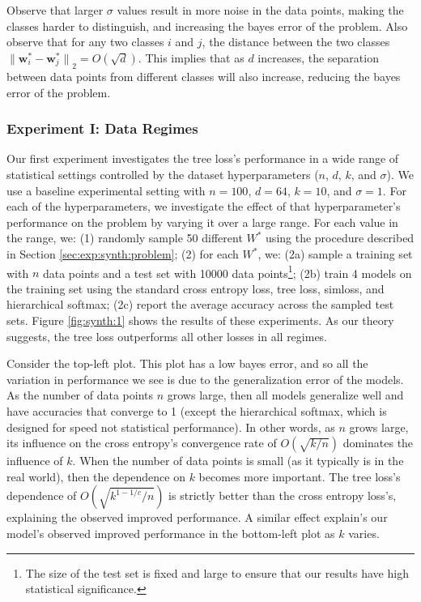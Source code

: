 \documentclass[twoside]{article}
\DeclareMathOperator*{\argmin}{arg\,min}
\renewcommand{\star}[1]{{#1}^{*}}
\newcommand{\w}{\mathbf w}
\newcommand{\x}{\mathbf x}
\newcommand{\ltwo}[1]{{\lVert {#1} \rVert}_2}
\begin{document}
Observe that larger $\sigma$ values result in
more noise in the data points,
making the classes harder to distinguish,
and increasing the bayes error of the problem.
Also observe that for any two classes $i$ and $j$,
the distance between the two classes $\ltwo{\star\w_i - \star\w_j} = O(\sqrt{d})$.
This implies that as $d$ increases,
the separation between data points from different classes will also increase,
reducing the bayes error of the problem.



\subsubsection{Experiment I: Data Regimes}

Our first experiment investigates the tree loss's performance in a wide range of statistical settings controlled by the dataset hyperparameters ($n$, $d$, $k$, and $\sigma$).
We use a baseline experimental setting with $n=100$, $d=64$, $k=10$, and $\sigma=1$.
For each of the hyperparameters, we investigate the effect of that hyperparameter's performance on the problem by varying it over a large range.
For each value in the range, we:
(1) randomly sample 50 different $\star W$ using the procedure described in Section \ref{sec:exp:synth:problem};
(2) for each $\star W$, we:
(2a) sample a training set with $n$ data points and a test set with 10000 data points\footnote{The size of the test set is fixed and large to ensure that our results have high statistical significance.};
(2b) train 4 models on the training set using the standard cross entropy loss, tree loss, simloss, and hierarchical softmax;
(2c) report the average accuracy across the sampled test sets.
Figure \ref{fig:synth:1} shows the results of these experiments.
As our theory suggests, the tree loss outperforms all other losses in all regimes.

Consider the top-left plot.
This plot has a low bayes error, and so all the variation in performance we see is due to the generalization error of the models.
As the number of data points $n$ grows large,
then all models generalize well and have accuracies that converge to 1 (except the hierarchical softmax, which is designed for speed not statistical performance).
In other words, as $n$ grows large, its influence on the cross entropy's convergence rate of $O(\sqrt{k/n})$ dominates the influence of $k$.
When the number of data points is small (as it typically is in the real world),
then the dependence on $k$ becomes more important.
The tree loss's dependence of $O(\sqrt{k^{1-1/c}/n})$ is strictly better than the cross entropy loss's,
explaining the observed improved performance.
A similar effect explain's our model's observed improved performance in the bottom-left plot as $k$ varies.
\end{document}
